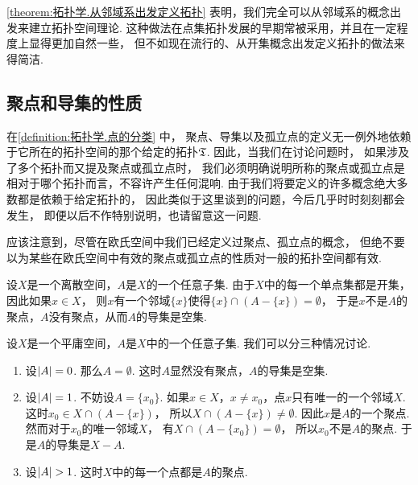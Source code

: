 \cref{theorem:拓扑学.从邻域系出发定义拓扑}
表明，我们完全可以从邻域系的概念出发来建立拓扑空间理论.
这种做法在点集拓扑发展的早期常被采用，并且在一定程度上显得更加自然一些，
但不如现在流行的、从开集概念出发定义拓扑的做法来得简洁.

\subsection{聚点和导集的性质}
在\cref{definition:拓扑学.点的分类} 中，
聚点、导集以及孤立点的定义无一例外地依赖于它所在的拓扑空间的那个给定的拓扑\(\mathfrak T\).
因此，当我们在讨论问题时，
如果涉及了多个拓扑而又提及聚点或孤立点时，
我们必须明确说明所称的聚点或孤立点是相对于哪个拓扑而言，不容许产生任何混响.
由于我们将要定义的许多概念绝大多数都是依赖于给定拓扑的，
因此类似于这里谈到的问题，今后几乎时时刻刻都会发生，
即便以后不作特别说明，也请留意这一问题.

应该注意到，尽管在欧氏空间中我们已经定义过聚点、孤立点的概念，
但绝不要以为某些在欧氏空间中有效的聚点或孤立点的性质对一般的拓扑空间都有效.

\begin{example}[离散空间中的聚点]\label{example:拓扑学.离散空间中的聚点}
设\(X\)是一个离散空间，\(A\)是\(X\)的一个任意子集.
由于\(X\)中的每一个单点集都是开集，因此如果\(x \in X\)，
则\(x\)有一个邻域\(\{x\}\)使得\(\{x\}\cap(A-\{x\})=\emptyset\)，
于是\(x\)不是\(A\)的聚点，\(A\)没有聚点，从而\(A\)的导集是空集.
\end{example}

\begin{example}[平庸空间中的聚点]\label{example:拓扑学.平庸空间中的聚点}
设\(X\)是一个平庸空间，\(A\)是\(X\)中的一个任意子集.
我们可以分三种情况讨论.
\begin{enumerate}
	\item 设\(\abs{A} = 0\).
	那么\(A = \emptyset\).
	这时\(A\)显然没有聚点，\(A\)的导集是空集.

	\item 设\(\abs{A} = 1\).
	不妨设\(A = \{x_0\}\).
	如果\(x \in X\)，\(x \neq x_0\)，点\(x\)只有唯一的一个邻域\(X\).
	这时\(x_0 \in X \cap (A - \{x\})\)，
	所以\(X \cap (A - \{x\}) \neq \emptyset\).
	因此\(x\)是\(A\)的一个聚点.
	然而对于\(x_0\)的唯一邻域\(X\)，
	有\(X \cap (A - \{x_0\}) = \emptyset\)，
	所以\(x_0\)不是\(A\)的聚点.
	于是\(A\)的导集是\(X - A\).

	\item 设\(\abs{A} > 1\).
	这时\(X\)中的每一个点都是\(A\)的聚点.
\end{enumerate}
\end{example}

